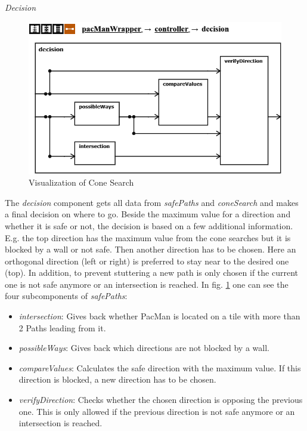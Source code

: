 \emph{Decision} \newline
\begin{figure}
	\label{fig:decision}
	\centering
	\includegraphics[scale=0.55]{pictures/PacMan/Decision.png}
	\caption{Visualization of Cone Search}
\end{figure}
The \textit{decision} component gets all data from \textit{safePaths} and \textit{coneSearch} and makes a final decision on where to go. Beside the maximum value for a direction and whether it is safe or not, the decision is based on a few additional information. E.g. the top direction has the maximum value from the cone searches but it is blocked by a wall or not safe. Then another direction has to be chosen. Here an orthogonal direction (left or right) is preferred to stay near to the desired one (top). In addition, to prevent stuttering a new path is only chosen if the current one is not safe anymore or an intersection is reached.
In fig. \ref{fig:decision} one can see the four subcomponents of \textit{safePaths}:
\begin{itemize}
	\item \textit{intersection}: Gives back whether PacMan is located on a tile with more than 2 Paths leading from it.
	\item \textit{possibleWays}: Gives back which directions are not blocked by a wall.
	\item \textit{compareValues}: Calculates the safe direction with the maximum value. If this direction is blocked, a new direction has to be chosen.
	\item \textit{verifyDirection}: Checks whether the chosen direction is opposing the previous one. This is only allowed if the previous direction is not safe anymore or an intersection is reached.
\end{itemize}